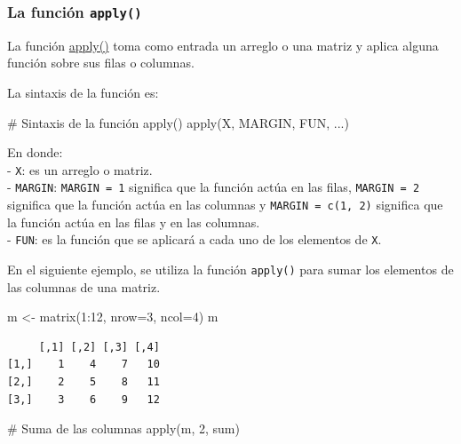 \documentclass[
  letterpaper,
  DIV=11,
  numbers=noendperiod]{scrreprt}
\newenvironment{Shaded}{\begin{snugshade}}{\end{snugshade}}
\newcommand{\AttributeTok}[1]{\textcolor[rgb]{0.40,0.45,0.13}{#1}}
\newcommand{\CommentTok}[1]{\textcolor[rgb]{0.37,0.37,0.37}{#1}}
\newcommand{\DecValTok}[1]{\textcolor[rgb]{0.68,0.00,0.00}{#1}}
\newcommand{\FunctionTok}[1]{\textcolor[rgb]{0.28,0.35,0.67}{#1}}
\newcommand{\NormalTok}[1]{\textcolor[rgb]{0.00,0.23,0.31}{#1}}
\newcommand{\OtherTok}[1]{\textcolor[rgb]{0.00,0.23,0.31}{#1}}
\newcommand{\SpecialCharTok}[1]{\textcolor[rgb]{0.37,0.37,0.37}{#1}}
\begin{document}
\hypertarget{la-funciuxf3n-apply}{%
\subsubsection{\texorpdfstring{La función
\texttt{apply()}}{La función apply()}}\label{la-funciuxf3n-apply}}

La función \href{https://rdrr.io/r/base/apply.html}{apply()} toma como
entrada un arreglo o una matriz y aplica alguna función sobre sus filas
o columnas.

La sintaxis de la función es:

\begin{Shaded}
\begin{Highlighting}[]
\CommentTok{\# Sintaxis de la función apply()}
\FunctionTok{apply}\NormalTok{(X, MARGIN, FUN, ...)}
\end{Highlighting}
\end{Shaded}

En donde:\\
- \texttt{X}: es un arreglo o matriz.\\
- \texttt{MARGIN}: \texttt{MARGIN\ =\ 1} significa que la función actúa
en las filas, \texttt{MARGIN\ =\ 2} significa que la función actúa en
las columnas y \texttt{MARGIN\ =\ c(1,\ 2)} significa que la función
actúa en las filas y en las columnas.\\
- \texttt{FUN}: es la función que se aplicará a cada uno de los
elementos de \texttt{X}.

En el siguiente ejemplo, se utiliza la función \texttt{apply()} para
sumar los elementos de las columnas de una matriz.

\begin{Shaded}
\begin{Highlighting}[]
\NormalTok{m }\OtherTok{\textless{}{-}} \FunctionTok{matrix}\NormalTok{(}\DecValTok{1}\SpecialCharTok{:}\DecValTok{12}\NormalTok{, }\AttributeTok{nrow=}\DecValTok{3}\NormalTok{, }\AttributeTok{ncol=}\DecValTok{4}\NormalTok{)}
\NormalTok{m}
\end{Highlighting}
\end{Shaded}

\begin{verbatim}
     [,1] [,2] [,3] [,4]
[1,]    1    4    7   10
[2,]    2    5    8   11
[3,]    3    6    9   12
\end{verbatim}

\begin{Shaded}
\begin{Highlighting}[]
\CommentTok{\# Suma de las columnas}
\FunctionTok{apply}\NormalTok{(m, }\DecValTok{2}\NormalTok{, sum)}
\end{Highlighting}
\end{Shaded}
\end{document}
